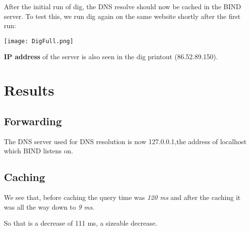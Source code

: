 After the initial run of dig, the DNS resolve should now be cached in the BIND server. To test this, we run dig again on the same website shortly after the first run:

\begin{center}
	\texttt{[image: DigFull.png]}
\end{center}

\textbf{IP address}
of the server is also seen in the dig printout (86.52.89.150).

\section{Results}
\subsection{Forwarding}
The DNS server used for DNS resolution is now 127.0.0.1,the address of localhost which BIND listens on.

\subsection{Caching}
We see that, before caching the query time was \textit{120 ms} and after the caching it was all the way down to \textit{9 ms}.

So that is a decrease of 111 ms, a sizeable decrease.






